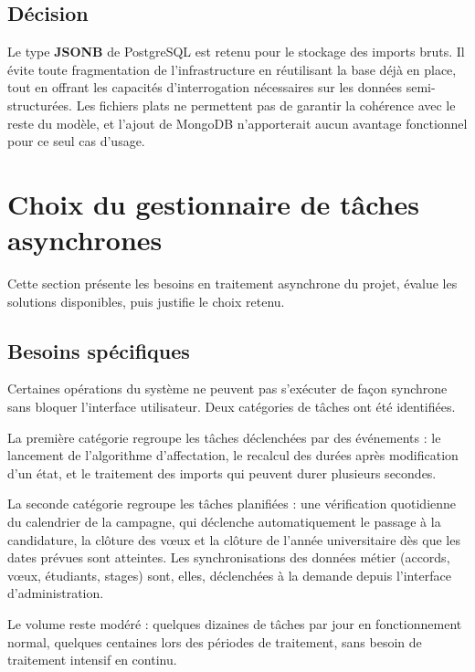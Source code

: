 \subsection{Décision}

Le type \textbf{JSONB} de PostgreSQL est retenu pour le stockage des imports
bruts. Il évite toute fragmentation de l'infrastructure en réutilisant la base
déjà en place, tout en offrant les capacités d'interrogation nécessaires sur
les données semi-structurées. Les fichiers plats ne permettent pas de garantir
la cohérence avec le reste du modèle, et l'ajout de MongoDB n'apporterait
aucun avantage fonctionnel pour ce seul cas d'usage.

\section{Choix du gestionnaire de tâches asynchrones}

Cette section présente les besoins en traitement asynchrone du projet,
évalue les solutions disponibles, puis justifie le choix retenu.

\subsection{Besoins spécifiques}

Certaines opérations du système ne peuvent pas s'exécuter de façon
synchrone sans bloquer l'interface utilisateur. Deux catégories de
tâches ont été identifiées.

La première catégorie regroupe les tâches déclenchées par des événements :
le lancement de l'algorithme d'affectation, le recalcul des durées
après modification d'un état, et le traitement des imports qui peuvent
durer plusieurs secondes.

La seconde catégorie regroupe les tâches planifiées : une vérification quotidienne du calendrier de la campagne, qui déclenche automatiquement le passage à la candidature, la clôture des vœux et la clôture de l'année universitaire dès que les dates prévues sont atteintes. Les synchronisations des données métier (accords, vœux, étudiants, stages) sont, elles, déclenchées à la demande depuis l'interface d'administration.

Le volume reste modéré : quelques dizaines de tâches par jour en
fonctionnement normal, quelques centaines lors des périodes de traitement,
sans besoin de traitement intensif en continu.

